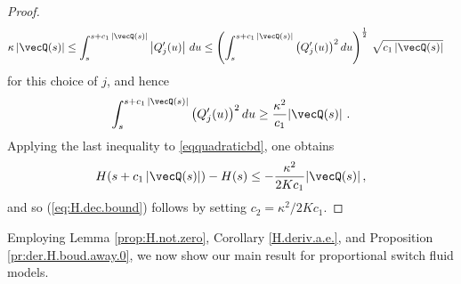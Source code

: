 \documentclass{amsart}
\begin{document}
\begin{proof}
\begin{align}
\kappa \, |\vecQ(s)| &
\leq \int_s^{s+c_1 \, |\vecQ(s)|} \left| Q'_j(u) \right| \, du \leq \left( \int_s^{s+c_1 \, |\vecQ(s)|} \left( Q'_j(u) \right)^2  du \right)^{\frac{1}{2}} \, \sqrt{c_1 \, |\vecQ(s)|}  \nonumber
\end{align} 
for this choice of $j$, and hence
$$ 
\int_s^{s+c_1 \, |\vecQ(s)|} \left( Q'_j(u) \right)^2 du \geq \frac{\kappa^2}{c_1} |\vecQ(s)|\ .
$$
Applying the last inequality to  \eqref{eqquadraticbd}, one obtains
\begin{equation*}
H(s+c_1 \, |\vecQ(s)|) - H(s) \leq - \frac{\kappa^2}{2Kc_1} |\vecQ(s)| \,,
\end{equation*}
and so   (\ref{eq:H.dec.bound}) follows by setting $c_2=\kappa^2/2Kc_1$.
\iffalse
By \eqref{eq:H.bounds} we have  
\begin{equation*}
H(t+c_1 \, |\vecQ(t)|) - H(t) \leq - \frac{K_5}{c_1}  \frac{1}{h_1} \, H(t)\ ,
\end{equation*}
and by letting $ \epsilon = K_5 / (h_1 \, c_1 )$ we have that
$H(t+c_1 \, |\vecQ(t)|) \leq ( 1 - \epsilon ) \, H(t)$.
Finally since the function $H(t)$ is non-increasing and non-negative it must be that 
\begin{equation*}
H(u) \leq ( 1 - \epsilon ) \, H(t).
\end{equation*}
for all $u \geq t + c_1 |\vecQ(t)|$.
\fi
\end{proof}

Employing Lemma \ref{prop:H.not.zero}, Corollary \ref{H.deriv.a.e.}, and Proposition \ref{pr:der.H.boud.away.0}, we now show our main result for proportional switch
fluid models.  
\end{document}
